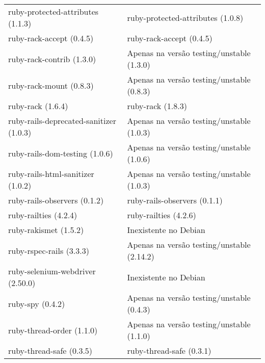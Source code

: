 \begin{table}[H]
\begin{tabular}{l|l}
        ruby-protected-attributes (1.1.3)                & ruby-protected-attributes (1.0.8)                                  \\
        ruby-rack-accept (0.4.5)                         & ruby-rack-accept (0.4.5)                                  \\
        ruby-rack-contrib (1.3.0)                        & Apenas na versão testing/unstable (1.3.0)                                  \\
        ruby-rack-mount (0.8.3)                          & Apenas na versão testing/unstable (0.8.3)                                  \\
        ruby-rack (1.6.4)                                & ruby-rack (1.8.3)                                  \\
        ruby-rails-deprecated-sanitizer (1.0.3)          & Apenas na versão testing/unstable (1.0.3)                                  \\
        ruby-rails-dom-testing (1.0.6)                   & Apenas na versão testing/unstable (1.0.6)                                  \\
        ruby-rails-html-sanitizer (1.0.2)                & Apenas na versão testing/unstable (1.0.3)                                  \\
        ruby-rails-observers (0.1.2)                     & ruby-rails-observers (0.1.1)                                  \\
        ruby-railties (4.2.4)                            & ruby-railties (4.2.6)                                  \\
        ruby-rakismet (1.5.2)                            & Inexistente no Debian                                  \\
        ruby-rspec-rails (3.3.3)                         & Apenas na versão testing/unstable (2.14.2)                                  \\
        ruby-selenium-webdriver (2.50.0)                 & Inexistente no Debian                                  \\
        ruby-spy (0.4.2)                                 & Apenas na versão testing/unstable (0.4.3)                                  \\
        ruby-thread-order (1.1.0)                        & Apenas na versão testing/unstable (1.1.0)                                  \\
        ruby-thread-safe (0.3.5)                         & ruby-thread-safe (0.3.1)                                  \\

\end{tabular}
\end{table}
